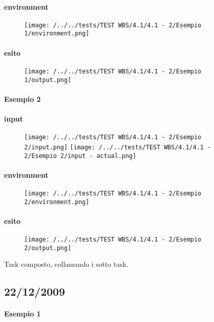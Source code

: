 \paragraph{environment}
\begin{figure}
\centering
\texttt{[image: /../../tests/TEST WBS/4.1/4.1 - 2/Esempio 1/environment.png]}
\end{figure}
\paragraph{esito}
\begin{figure}
\centering
\texttt{[image: /../../tests/TEST WBS/4.1/4.1 - 2/Esempio 1/output.png]}
\end{figure}

\paragraph{Esempio 2}
\paragraph{input}
\begin{figure}
\centering
\texttt{[image: /../../tests/TEST WBS/4.1/4.1 - 2/Esempio 2/input.png]}
\texttt{[image: /../../tests/TEST WBS/4.1/4.1 - 2/Esempio 2/input - actual.png]}
\end{figure}
\paragraph{environment}
\begin{figure}
\centering
\texttt{[image: /../../tests/TEST WBS/4.1/4.1 - 2/Esempio 2/environment.png]}
\end{figure}
\paragraph{esito}
\begin{figure}
\centering
\texttt{[image: /../../tests/TEST WBS/4.1/4.1 - 2/Esempio 2/output.png]}
\end{figure}

Task composto, collassando i sotto task.

\subsection{22/12/2009}
\paragraph{Esempio 1}
